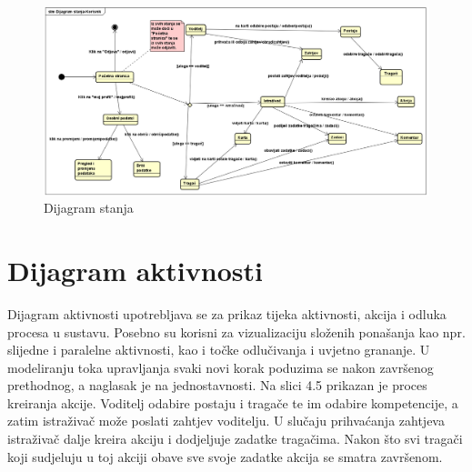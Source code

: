 			\begin{figure}[H]
				\centering
				\includegraphics[width=\textwidth]{slike/Dijagram_stanja.PNG}
				\caption{Dijagram stanja }
				\label{fig:dijagram_baze}
			\end{figure}
			
			\eject 
		
		\section{Dijagram aktivnosti}
			
		Dijagram aktivnosti upotrebljava se za prikaz tijeka aktivnosti, akcija i odluka procesa u sustavu. Posebno su korisni za vizualizaciju složenih ponašanja kao npr. slijedne i paralelne aktivnosti, kao i točke odlučivanja i uvjetno grananje. U modeliranju toka upravljanja svaki novi korak poduzima se nakon završenog prethodnog, a naglasak je na jednostavnosti. Na slici 4.5 prikazan je proces kreiranja akcije. Voditelj odabire postaju i tragače te im odabire kompetencije, a zatim istraživač može poslati zahtjev voditelju. U slučaju prihvaćanja zahtjeva istraživač dalje kreira akciju i dodjeljuje zadatke tragačima. Nakon što svi tragači koji sudjeluju u toj akciji obave sve svoje zadatke akcija se smatra završenom. 
		
